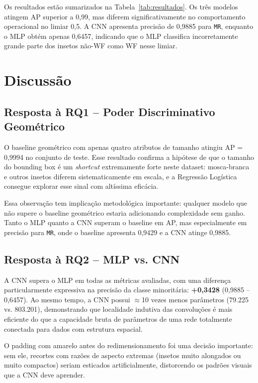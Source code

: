 \documentclass[conference]{IEEEtran}
\begin{document}
Os resultados estão sumarizados na Tabela~\ref{tab:resultados}.
Os três modelos atingem AP superior a 0,99, mas diferem
significativamente no comportamento operacional no limiar 0,5.
A CNN apresenta precisão de 0,9885 para \texttt{MR}, enquanto o MLP
obtém apenas 0,6457, indicando que o MLP classifica incorretamente
grande parte dos insetos não-WF como WF nesse limiar.

\section{Discussão}

\subsection{Resposta à RQ1 -- Poder Discriminativo Geométrico}

O baseline geométrico com apenas quatro atributos de tamanho atingiu
AP = 0,9994 no conjunto de teste. Esse resultado confirma a hipótese
de que o tamanho do bounding box é um \textit{shortcut} extremamente
forte neste dataset: mosca-branca e outros insetos diferem
sistematicamente em escala, e a Regressão Logística consegue explorar
esse sinal com altíssima eficácia.

Essa observação tem implicação metodológica importante: qualquer modelo
que não supere o baseline geométrico estaria adicionando complexidade
sem ganho. Tanto o MLP quanto a CNN superam o baseline em AP, mas
especialmente em precisão para \texttt{MR}, onde o baseline apresenta
0,9429 e a CNN atinge 0,9885.

\subsection{Resposta à RQ2 -- MLP vs. CNN}

A CNN supera o MLP em todas as métricas avaliadas, com uma diferença
particularmente expressiva na precisão da classe minoritária:
\textbf{+0,3428} (0,9885 -- 0,6457). Ao mesmo tempo, a CNN possui
$\approx$10 vezes menos parâmetros (79.225 vs. 803.201), demonstrando
que localidade indutiva das convoluções é mais eficiente do que a
capacidade bruta de parâmetros de uma rede totalmente conectada para
dados com estrutura espacial.

O padding com amarelo antes do redimensionamento foi uma decisão
importante: sem ele, recortes com razões de aspecto extremas (insetos
muito alongados ou muito compactos) seriam esticados artificialmente,
distorcendo os padrões visuais que a CNN deve aprender.
\end{document}
